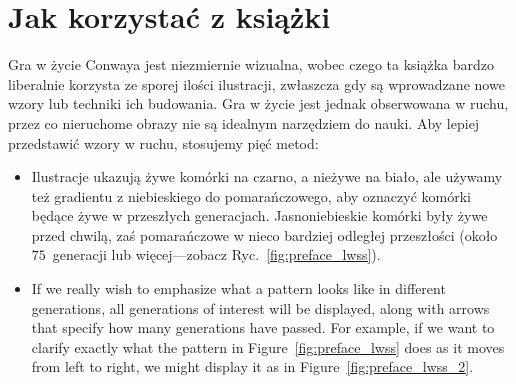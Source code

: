 \section*{Jak korzystać z książki}

Gra w życie Conwaya jest niezmiernie wizualna, wobec czego ta książka bardzo liberalnie korzysta ze sporej ilości ilustracji, zwłaszcza gdy są wprowadzane nowe wzory lub techniki ich budowania. Gra w życie jest jednak obserwowana w ruchu, przez co nieruchome obrazy nie są idealnym narzędziem do nauki. Aby lepiej przedstawić wzory w ruchu, stosujemy pięć metod:\medskip

\begin{itemize}
	\item Ilustracje ukazują żywe komórki na czarno, a nieżywe na biało, ale używamy też gradientu z niebieskiego do pomarańczowego, aby oznaczyć komórki będące żywe w przeszłych generacjach. Jasnoniebieskie komórki były żywe przed chwilą, zaś pomarańczowe w nieco bardziej odległej przeszłości (około $75$~generacji lub więcej---zobacz Ryc.~\ref{fig:preface_lwss}).\bigskip

	\noindent\begin{minipage}{\linewidth}
		\centering{}
		\label{fig:preface_lwss}\bigskip
	\end{minipage}
	
	\item If we really wish to emphasize what a pattern looks like in different generations, all generations of interest will be displayed, along with arrows that specify how many generations have passed. For example, if we want to clarify exactly what the pattern in Figure~\ref{fig:preface_lwss} does as it moves from left to right, we might display it as in Figure~\ref{fig:preface_lwss_2}.\bigskip
	
	\noindent\begin{minipage}{\linewidth}
		\centering{}
		\label{fig:preface_lwss_2}\bigskip
	\end{minipage}


\end{itemize}
